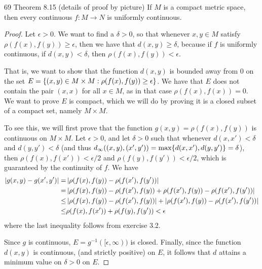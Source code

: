 \begin{exercise}{69 Theorem 8.15 (details of proof by picture)}
If $M$ is a compact metric space, then every continuous $f:M\to N$ is uniformly continuous.
\end{exercise}
\begin{proof}
Let $\epsilon>0$.
We want to find a $\delta > 0$, so that whenever $x,y\in M$ satisfy $\rho(f(x),f(y)) \geq \epsilon$, then we have that $d(x,y) \geq \delta$, because if $f$ is uniformly continuous, if $d(x,y) < \delta$, then $\rho(f(x),f(y)) < \epsilon$.

That is, we want to show that the function $d(x,y)$ is bounded away from 0 on the set $E=\{(x,y) \in M \times M : \rho(f(x),f(y)) \geq \epsilon\}$.
We have that $E$ does not contain the pair $(x,x)$ for all $x\in M$, as in that case $\rho(f(x),f(x)) = 0$.
We want to prove $E$ is compact, which we will do by proving it is a closed subset of a compact set, namely $M\times M$.

To see this, we will first prove that the function $g(x,y) = \rho(f(x),f(y))$ is continuous on $M \times M$.
Let $\epsilon>0$, and let $\delta >0$ such that whenever $d(x,x')<\delta$ and $d(y,y')<\delta$ (and thus $d_\infty((x,y), (x',y')) = \max\{d(x,x'), d(y,y')\} = \delta$), then $\rho(f(x),f(x'))<\epsilon/2$ and $\rho(f(y),f(y'))<\epsilon/2$, which is guaranteed by the continuity of $f$.
We have 
\begin{align*}
    \left\lvert g(x,y)- g(x',y')\right\rvert
    =& \left\lvert \rho(f(x),f(y)) - \rho(f(x'),f(y'))\right\rvert\\
    =& \left\lvert \rho(f(x),f(y)) - \rho(f(x'),f(y))
    + \rho(f(x'),f(y)) - \rho(f(x'),f(y'))\right\rvert\\
    \leq& \left\lvert \rho(f(x),f(y)) - \rho(f(x'),f(y))\right\rvert
    + \left\lvert \rho(f(x'),f(y)) - \rho(f(x'),f(y'))\right\rvert\\
    \leq& \rho(f(x),f(x')) + \rho(f(y),f(y')) < \epsilon
\end{align*}
where the last inequality follows from exercise 3.2.

Since $g$ is continuous, $E=g^{-1}([\epsilon, \infty))$ is closed.
Finally, since the function $d(x,y)$ is continuous, (and strictly positive) on $E$, it follows that $d$ attains a minimum value on $\delta>0$ on $E$.
\end{proof} 

